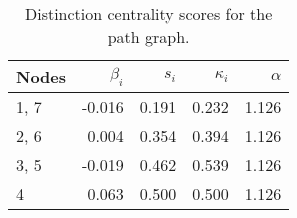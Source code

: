\begin{table}
\centering
\caption{\label{tab:path}Distinction centrality scores for the path graph.}
\centering
\begin{tabular}[t]{lrrrr}
\toprule
Nodes & $\beta_i$ & $s_i$ & $\kappa_i$ & $\alpha$\\
\midrule
1, 7 & -0.016 & 0.191 & 0.232 & 1.126\\
2, 6 & 0.004 & 0.354 & 0.394 & 1.126\\
3, 5 & -0.019 & 0.462 & 0.539 & 1.126\\
4 & 0.063 & 0.500 & 0.500 & 1.126\\
\bottomrule
\end{tabular}
\end{table}
